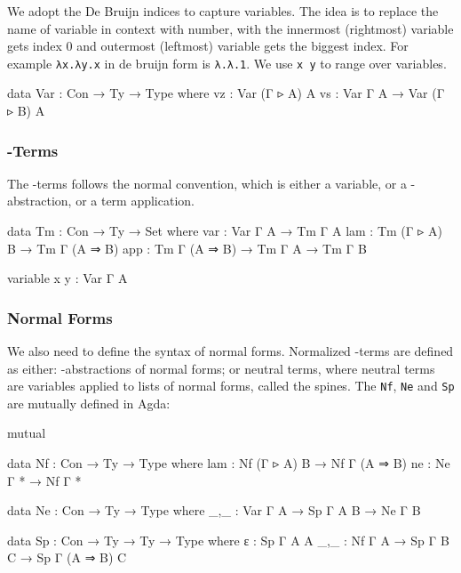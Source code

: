 We adopt the De Bruijn indices to capture variables. The idea is to replace the name of variable in context with number, with the innermost (rightmost) variable gets index 0 and outermost (leftmost) variable gets the biggest index. For example \texttt{λx.λy.x} in de bruijn form is \texttt{λ.λ.1}. We use \texttt{x y} to range over variables.

\begin{code}
data Var : Con → Ty → Type where
  vz : Var (Γ ▹ A) A
  vs : Var Γ A → Var (Γ ▹ B) A
\end{code}

\subsubsection*{\lambda-Terms}

The \lambda-terms follows the normal convention, which is either a variable, or a \lambda-abstraction, or a term application.

\begin{code}
data Tm : Con → Ty → Set where
  var : Var Γ A → Tm Γ A
  lam : Tm (Γ ▹ A) B → Tm Γ (A ⇒ B)
  app : Tm Γ (A ⇒ B) → Tm Γ A → Tm Γ B
\end{code}

\begin{code}[hide]
variable x y : Var Γ A
\end{code}

\subsubsection*{Normal Forms}

We also need to define the syntax of normal forms. Normalized \lambda-terms are defined as either: \lambda-abstractions of normal forms; or neutral terms, where neutral terms are variables applied to lists of normal forms, called the spines. The \texttt{Nf}, \texttt{Ne} and \texttt{Sp} are mutually defined in Agda:

\begin{code}
mutual
\end{code}

\begin{code}
  data Nf : Con → Ty → Type where
    lam : Nf (Γ ▹ A) B → Nf Γ (A ⇒ B)
    ne  : Ne Γ * → Nf Γ *

  data Ne : Con → Ty → Type where
    _,_ : Var Γ A → Sp Γ A B → Ne Γ B

  data Sp : Con → Ty → Ty → Type where
    ε   : Sp Γ A A
    _,_ : Nf Γ A → Sp Γ B C → Sp Γ (A ⇒ B) C
\end{code}

